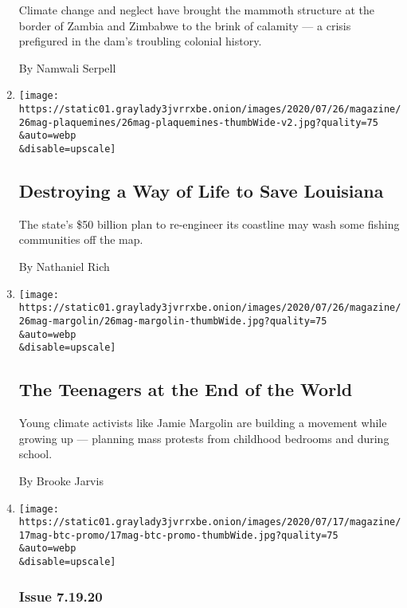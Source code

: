 \begin{enumerate}
  Climate change and neglect have brought the mammoth structure at the
  border of Zambia and Zimbabwe to the brink of calamity --- a crisis
  prefigured in the dam's troubling colonial history.

  By Namwali Serpell
\item
  \href{/interactive/2020/07/21/magazine/louisiana-coast-engineering.html}{}

  \texttt{[image: https://static01.graylady3jvrrxbe.onion/images/2020/07/26/magazine/26mag-plaquemines/26mag-plaquemines-thumbWide-v2.jpg?quality=75\\\&auto=webp\\\&disable=upscale]}

  \hypertarget{destroying-a-way-of-life-to-save-louisiana}{%
  \subsection{Destroying a Way of Life to Save
  Louisiana}\label{destroying-a-way-of-life-to-save-louisiana}}

  The state's \$50 billion plan to re-engineer its coastline may wash
  some fishing communities off the map.

  By Nathaniel Rich
\item
  \href{/interactive/2020/07/21/magazine/teenage-activist-climate-change.html}{}

  \texttt{[image: https://static01.graylady3jvrrxbe.onion/images/2020/07/26/magazine/26mag-margolin/26mag-margolin-thumbWide.jpg?quality=75\\\&auto=webp\\\&disable=upscale]}

  \hypertarget{the-teenagers-at-the-end-of-the-world}{%
  \subsection{The Teenagers at the End of the
  World}\label{the-teenagers-at-the-end-of-the-world}}

  Young climate activists like Jamie Margolin are building a movement
  while growing up --- planning mass protests from childhood bedrooms
  and during school.

  By Brooke Jarvis
\item
  \href{/2020/07/17/magazine/behind-the-cover-why-covid-19-is-winning.html}{}

  \texttt{[image: https://static01.graylady3jvrrxbe.onion/images/2020/07/17/magazine/17mag-btc-promo/17mag-btc-promo-thumbWide.jpg?quality=75\\\&auto=webp\\\&disable=upscale]}

  \hypertarget{issue-71920}{%
  \subsubsection{Issue 7.19.20}\label{issue-71920}}


\end{enumerate}
